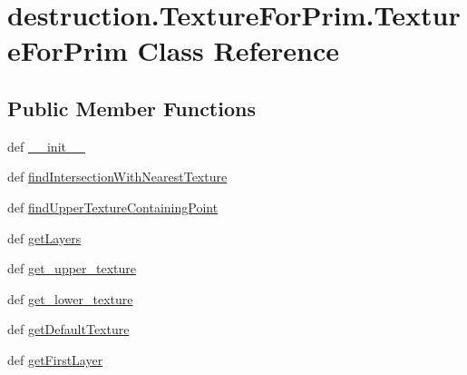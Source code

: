 \hypertarget{classdestruction_1_1_texture_for_prim_1_1_texture_for_prim}{\section{destruction.\-Texture\-For\-Prim.\-Texture\-For\-Prim Class Reference}
\label{classdestruction_1_1_texture_for_prim_1_1_texture_for_prim}
}
\subsection*{Public Member Functions}
\begin{DoxyCompactItemize}
\item 
def \hyperlink{classdestruction_1_1_texture_for_prim_1_1_texture_for_prim_ac31191eecb06f01325d05e55cb65ecaf}{\-\_\-\-\_\-init\-\_\-\-\_\-}
\item 
def \hyperlink{classdestruction_1_1_texture_for_prim_1_1_texture_for_prim_a93933e4b1819b7c2ea6c92ee32c1d0ea}{find\-Intersection\-With\-Nearest\-Texture}
\item 
def \hyperlink{classdestruction_1_1_texture_for_prim_1_1_texture_for_prim_a225960a8ac1f0c9bf176c9fca72e27a0}{find\-Upper\-Texture\-Containing\-Point}
\item 
def \hyperlink{classdestruction_1_1_texture_for_prim_1_1_texture_for_prim_a4d81f11889e26f12be087d4cb7fda5af}{get\-Layers}
\item 
def \hyperlink{classdestruction_1_1_texture_for_prim_1_1_texture_for_prim_a2b449270bd124a3caac4971e0acd52c0}{get\-\_\-upper\-\_\-texture}
\item 
def \hyperlink{classdestruction_1_1_texture_for_prim_1_1_texture_for_prim_a7f9a83bdef8aee4f099d31785a2e9f3e}{get\-\_\-lower\-\_\-texture}
\item 
def \hyperlink{classdestruction_1_1_texture_for_prim_1_1_texture_for_prim_aad793bf69841307e1df61c0abb7d8df0}{get\-Default\-Texture}
\item 
def \hyperlink{classdestruction_1_1_texture_for_prim_1_1_texture_for_prim_a402fb4e59315bbc30e0f3d33b40a6d09}{get\-First\-Layer}
\end{DoxyCompactItemize}
